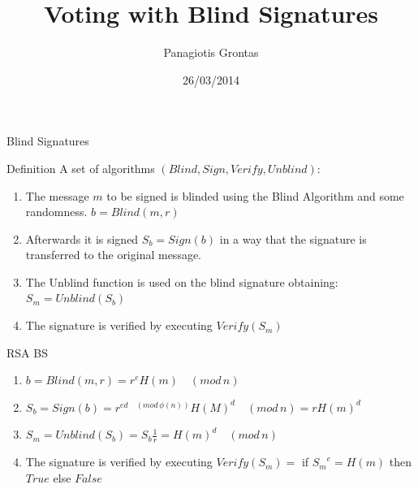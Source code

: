 \documentclass{beamer}
\title{Voting with Blind Signatures}
\author{Panagiotis Grontas}
\date{26/03/2014}
\institute{$\mu\Pi\lambda\forall$  - CoReLab Crypto Group}
\newcommand{\md}[1]{\quad (mod \, {#1})}
\begin{document}
\begin{frame}
\titlepage
\end{frame}

\begin{frame}[allowframebreaks]{Blind Signatures}

\begin{block}{Definition}
A set of algorithms $(Blind, Sign, Verify, Unblind)$:
\begin{enumerate}
\item The message $m$ to be signed is blinded using the Blind Algorithm and some randomness. $b=Blind(m,r)$
\item Afterwards it is signed $S_b = Sign(b)$ in a way that the signature is transferred to the original message.
\item The Unblind function is used on the blind signature obtaining: $S_m = Unblind(S_b)$
\item The signature is verified by executing $Verify(S_m)$
\end{enumerate}
\end{block}

\begin{block}{RSA BS}
\begin{enumerate}
\item $b = Blind(m,r) = r^e H(m) \md{n}$
\item $S_b = Sign(b) = r^{ed \md{\phi(n)}} H(M)^d \md{n} = r H(m)^d $
\item $S_m = Unblind(S_b) = S_b \frac{1}{r} = H(m)^d \md{n}$
\item The signature is verified by executing $Verify(S_m) = $ if ${S_m}^{e} = H(m)$ then $True$ else $False$
\end{enumerate}
\end{block}
\end{frame}
\end{document}
